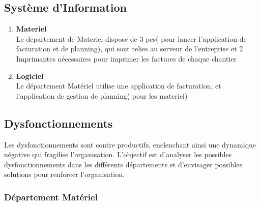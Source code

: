 \documentclass [a4paper] {report}
\begin{document}
\subsection{Système d'Information}
\begin{enumerate}

\item  \textbf{Materiel}\\

Le departement de Materiel dispose de 3 pcs( pour lancer l'application de facturation et de planning), qui sont relies au serveur de l'entreprise et 2 Imprimantes nécessaires pour imprimer les factures de chaque chantier\\

\item  \textbf{ Logiciel}\\

Le département Matériel utilise une application de facturation, et l'application de gestion de planning( pour les materiel)\\
\end{enumerate}

\subsection{Dysfonctionnements}
Les dysfonctionnements sont contre productifs, enclenchant ainsi une dynamique négative qui fragilise l'organisation. L'objectif est d'analyser les possibles dysfonctionnements dans les différents départements et d'envisager 
possibles solutions pour renforcer l'organisation.

\subsubsection{Département Matériel}

	
	
\end{document}
